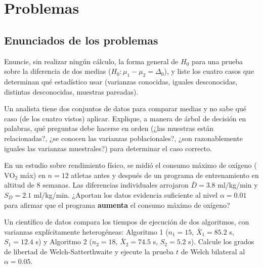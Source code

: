 \section*{Problemas}

\subsection*{Enunciados de los problemas}

\begin{problema}
	\label{prob:16e7075}
	Enuncie, sin realizar ningún cálculo, la forma general de $H_0$ para una prueba sobre la diferencia de dos medias ($H_0:\mu_1-\mu_2=\Delta_0$), y liste los cuatro casos que determinan qué estadístico usar (varianzas conocidas, iguales desconocidas, distintas desconocidas, muestras pareadas).
\end{problema}

\begin{problema}
	\label{prob:b9ad2de}
	Un analista tiene dos conjuntos de datos para comparar medias y no sabe qué caso (de los cuatro vistos) aplicar. Explique, a manera de árbol de decisión en palabras, qué preguntas debe hacerse en orden (¿las muestras están relacionadas?, ¿se conocen las varianzas poblacionales?, ¿son razonablemente iguales las varianzas muestrales?) para determinar el caso correcto.
\end{problema}

\begin{problema}
	\label{prob:b0c0618}
	En un estudio sobre rendimiento físico, se midió el consumo máximo de oxígeno ($\text{VO}_2$ máx) en $n=12$ atletas antes y después de un programa de entrenamiento en altitud de 8 semanas. Las diferencias individuales arrojaron $\bar D=3.8$ ml/kg/min y $S_D=2.1$ ml/kg/min. ¿Aportan los datos evidencia suficiente al nivel $\alpha=0.01$ para afirmar que el programa \textbf{aumenta} el consumo máximo de oxígeno?
\end{problema}

\begin{problema}
	\label{prob:f2e4336}
	Un científico de datos compara los tiempos de ejecución de dos algoritmos, con varianzas explícitamente heterogéneas: Algoritmo 1 ($n_1=15$, $\bar X_1=85.2$ s, $S_1=12.4$ s) y Algoritmo 2 ($n_2=18$, $\bar X_2=74.5$ s, $S_2=5.2$ s). Calcule los grados de libertad de Welch-Satterthwaite y ejecute la prueba $t$ de Welch bilateral al $\alpha=0.05$.
\end{problema}

